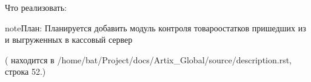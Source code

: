 \documentclass[letterpaper,10pt,russian]{sphinxmanual}
\begin{document}
\sphinxAtStartPar
Что реализовать:

\begin{sphinxadmonition}{note}{План:}
\sphinxAtStartPar
Планируется добавить модуль контроля товаро\sphinxhyphen{}остатков пришедших из  и выгруженных в кассовый сервер
\end{sphinxadmonition}

\sphinxAtStartPar
({\hyperref[\detokenize{description:id2}]{}} находится в /home/bat/Project/docs/Artix\_Global/source/description.rst, строка 52.)



\renewcommand{\indexname}{Алфавитный указатель}
\printindex
\end{document}
